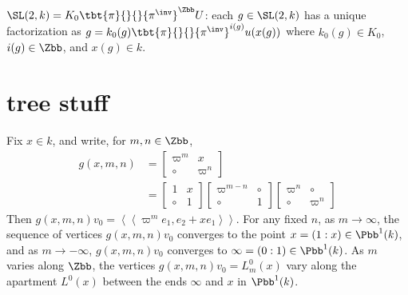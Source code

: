 \documentclass{book}
\begin{document}
\begin{lemma}
    $\SL(2,k) = K_0 \tbt{\pi}{}{}{\pi^\inv}^\Zbb U$: each $g \in \SL(2,k)$ has a unique factorization as $g=k_0(g) \tbt{\pi}{}{}{\pi^\inv}^{i(g)}u(x(g))$ where $k_0(g) \in K_0$, $i(g) \in \Zbb$, and $x(g) \in k$.
\end{lemma}


\section*{tree stuff}
Fix $x\in k$, and write, for $m,n \in \Zbb$,
\begin{align*}
    g(x,m,n) & = \left[\begin{array}{cc}
                               \varpi^m & x        \\
                               \circ    & \varpi^n
                           \end{array}\right]                                                \\
             & =\left[\begin{array}{ll}
                              1     & x \\
                              \circ & 1
                          \end{array}\right]\left[\begin{array}{cc}
                                                      \varpi^{m-n} & \circ \\
                                                      \circ        & 1
                                                  \end{array}\right]\left[\begin{array}{cc}
                                                                              \varpi^n & \circ    \\
                                                                              \circ    & \varpi^n
                                                                          \end{array}\right]
\end{align*}
Then $g(x,m,n)v_0 = \left\langle\left\langle\varpi^m e_1, e_2+x e_1\right\rangle\right\rangle$. For any fixed $n$, as $m\to \infty$, the sequence of vertices $g(x,m,n)v_0$ converges to the point $x=(1:x) \in \Pbb^1(k)$, and as $m \to -\infty$, $g(x,m,n)v_0$ converges to $\infty = (0:1) \in \Pbb^1(k)$. As $m$ varies along $\Zbb$, the vertices $g(x,m,n)v_0 = L_m^0(x)$ vary along the apartment $L^0(x)$ between the ends $\infty$ and $x$ in $\Pbb^1(k)$.
\end{document}
